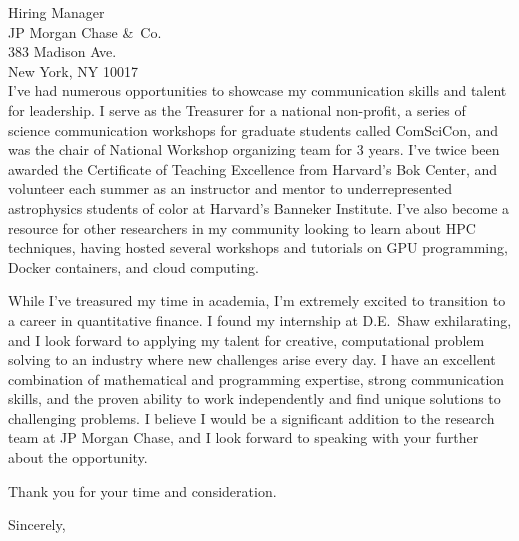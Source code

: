 \documentclass{letter}
\begin{document}
\begin{letter}{Hiring Manager\\
    JP Morgan Chase \&~Co.\\ 383 Madison Ave.\\ New York, NY 10017 \\ }
\noindent I've had numerous opportunities to showcase my communication skills
and talent for leadership. I serve as the Treasurer for a national
non-profit, a series of science communication workshops for graduate students
called ComSciCon, and was the chair of National Workshop organizing team for 3
years. I've twice been awarded the Certificate of Teaching Excellence from
Harvard's Bok Center, and volunteer each summer as an instructor and mentor to
underrepresented astrophysics students of color at Harvard's Banneker
Institute. I've also become a resource for other researchers in my community
looking to learn about HPC techniques, having hosted several workshops and
tutorials on GPU programming, Docker containers, and cloud computing.

\noindent While I've treasured my time in academia, I'm extremely excited to
transition to a career in quantitative finance. I found my internship at
D.E.~Shaw exhilarating, and I look forward to applying my talent for creative,
computational problem solving to an industry where new challenges arise every
day. I have an excellent combination of mathematical and programming
expertise, strong communication skills, and the proven ability to work
independently and find unique solutions to challenging problems. I believe I
would be a significant addition to the research team at JP Morgan Chase, and I look forward to
speaking with your further about the opportunity.

Thank you for your time and consideration.

\closing{Sincerely,}

\end{letter}
\end{document}
